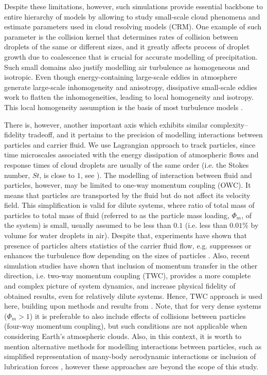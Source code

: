 \documentclass{pracamgren}
\begin{document}
Despite these limitations, however, such simulations provide essential backbone to entire hierarchy of models by allowing to study small-scale cloud phenomena and estimate parameters used in cloud resolving models (CRM).
One example of such parameter is the collision kernel that determines rates of collision between droplets of the same or different sizes, and it greatly affects process of droplet growth due to coalescence that is crucial for accurate modelling of precipitation.
Such small domains also justify modelling air turbulence as homogeneous and isotropic.
Even though energy-containing large-scale eddies in atmosphere generate large-scale inhomogeneity and anisotropy, dissipative small-scale eddies work to flatten the inhomogeneities, leading to local homogeneity and isotropy.
This local homogeneity assumption is the basis of most turbulence models \parencite{Matsuda2021}.

There is, however, another important axis which exhibits similar complexity--fidelity tradeoff, and it pertains to the precision of modelling interactions between particles and carrier fluid.
We use Lagrangian approach to track particles, since time microscales associated with the energy dissipation of atmospheric flows and response times of cloud droplets are usually of the same order (i.e. the Stokes number, $St$, is close to $1$, see \cite{Balachandar2009}).
The modelling of interaction between fluid and particles, however, may be limited to one-way momentum coupling (OWC).
It means that particles are transported by the fluid but do not affect its velocity field.
This simplification is valid for dilute systems, where ratio of total mass of particles to total mass of fluid (referred to as the particle mass loading, $\Phi_m$, of the system) is small, usually assumed to be less than $0.1$ (i.e. less than $0.01\%$ by volume for water droplets in air).
Despite that, experiments have shown that presence of particles alters statistics of the carrier fluid flow, e.g. suppresses or enhances the turbulence flow depending on the sizes of particles \parencite{Gore1989}.
Also, recent simulation studies \parencite{Rosa2020} have shown that inclusion of momentum transfer in the other direction, i.e. two-way momentum coupling (TWC), provides a more complete and complex picture of system dynamics, and increase physical fidelity of obtained results, even for relatively dilute systems.
Hence, TWC approach is used here, building upon methods and results from \textcite{Rosa2020,Rosa2022}.
Note, that for very dense systems ($\Phi_m > 1$) it is preferable to also include effects of collisions between particles (four-way momentum coupling), but such conditions are not applicable when considering Earth's atmospheric clouds.
Also, in this context, it is worth to mention alternative methods for modelling interactions between particles, such as simplified representation of many-body aerodynamic interactions \parencite[Hybrid DNS, see][]{Wang2009, Ayala2007} or inclusion of lubrication forces \parencite{Ababaei2021}, however these approaches are beyond the scope of this study.
\end{document}
